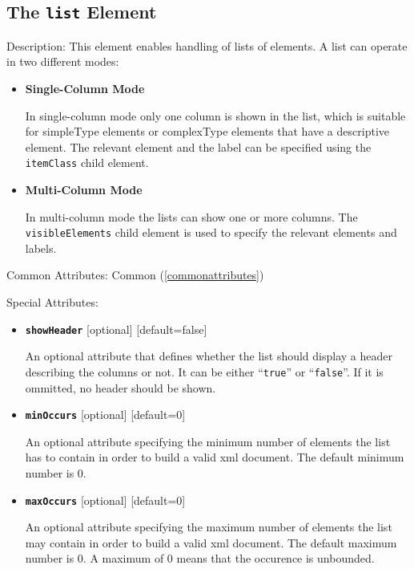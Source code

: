 \subsection{ The \texttt{list} Element}
\begin{description}
 \item Description: This element enables handling of lists of elements. A list can operate in two different modes:
\begin{itemize}
 \item \textbf{Single-Column Mode}

In single-column mode only one column is shown in the list, which is suitable for simpleType elements or complexType elements that have a descriptive element. The relevant element and the label can be specified using the \texttt{itemClass} child element.

 \item \textbf{Multi-Column Mode}

In multi-column mode the lists can show one or more columns. The \texttt{visibleElements} child element is used to specify the relevant elements and labels.
\end{itemize}


 \item Common Attributes: Common (\ref{commonattributes})

 \item Special Attributes:

\begin{itemize}
 \item \textbf{\texttt{showHeader}} [optional] [default=false]

An optional attribute that defines whether the list should display a header describing the columns or not. It can be either ``\texttt{true}'' or ``\texttt{false}''. If it is ommitted, no header should be shown.

 \item \textbf{\texttt{minOccurs}} [optional] [default=0]

An optional attribute specifying the minimum number of elements the list has to contain in order to build a valid xml document. The default minimum number is 0.

 \item \textbf{\texttt{maxOccurs}} [optional] [default=0]

An optional attribute specifying the maximum number of elements the list may contain in order to build a valid xml document. The default maximum number is 0. A maximum of 0 means that the occurence is unbounded.
\end{itemize}



\end{description}
